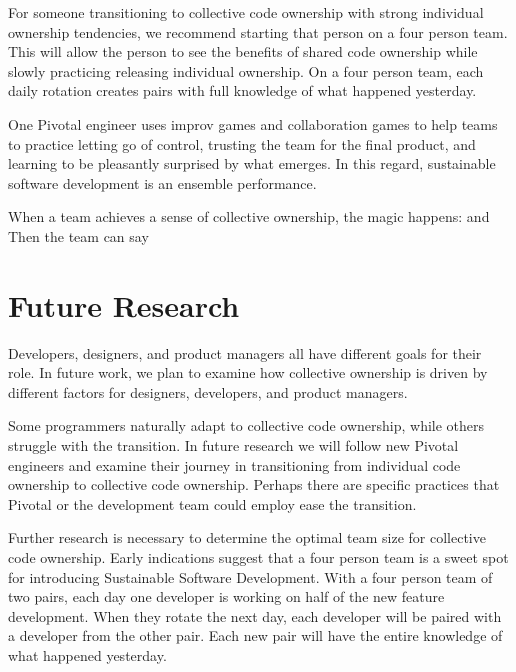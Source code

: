 For someone transitioning to collective code ownership with strong individual ownership tendencies, we recommend starting that person on a four person team. This will allow the person to see the benefits of shared code ownership while slowly practicing releasing individual ownership. On a four person team, each daily rotation creates pairs with full knowledge of what happened yesterday.  


One Pivotal engineer uses improv games and collaboration games to help teams to practice letting go of control, trusting the team for the final product, and learning to be pleasantly surprised by what emerges. In this regard, sustainable software development is an ensemble performance. 

When a team achieves a sense of collective ownership, the magic happens:  and  Then the team can say 



\section{Future Research}
Developers, designers, and product managers all have different goals for their role. In future work,  we plan to examine how collective ownership is driven by different factors for designers, developers, and product managers.

Some programmers naturally adapt to collective code ownership, while others struggle with the transition. In future research we will follow new Pivotal engineers and examine their journey in transitioning from individual code ownership to collective code ownership. Perhaps there are 
specific practices that Pivotal or the development team could employ ease the transition. 

Further research is necessary to determine the optimal team size for collective code ownership. Early indications suggest that a four person team is a sweet spot for introducing Sustainable Software Development. With a four person team of two pairs, each day one developer is working on half of the new feature development. When they rotate the next day, each developer will be paired with a developer from the other pair. Each new pair will have the entire knowledge of what happened yesterday. 
